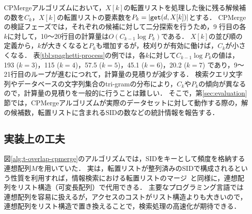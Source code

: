 \documentclass[japanese]{jnlp_JS2.0}
\begin{document}
CPMergeアルゴリズムにおいて，$X[k]$の転置リストを処理した後に残る解候補の数を$C_k$，$X[k]$の転置リストの要素数を$P_k = |\mbox{\tt get}(d, X[k])|$とする．
CPMergeの検証フェーズでは，それぞれの候補に対して二分探索を行うため，9 行目の各$k$に対して，10〜20行目の計算量は$O(C_{k-1} \log P_k)$である．
$X[k]$の並び順の定義から，$k$が大きくなると$P_k$も増加するが，枝刈りが有効に働けば，$C_k$が小さくなる．
表\ref{tbl:spaghetti-process}の例では，各$k$に対して$C_{k-1} \log P_k$の値は，193 ($k = 3$)，115 ($k = 4$)，57.5 ($k = 5$)，45.1 ($k = 6$)，20.2 ($k = 7$) であり，9〜21行目のループが進むにつれて，計算量の見積りが減少する．
検索クエリ文字列やデータベースの文字列集合のtri-gramの分布により，$C_k$や$P_k$の傾向が異なるので，計算量の見積りを一般的に行うことは難しい．
そこで，第\ref{sec:evaluation}節では，CPMergeアルゴリズムが実際のデータセットに対して動作する際の，解の候補数，転置リストに含まれるSIDの数などの統計情報を報告する．



\subsection{実装上の工夫}

図\ref{alg:t-overlap-cpmerge}のアルゴリズムでは，SIDをキーとして頻度を格納する連想配列$M$を用いていた．
実は，転置リストが整列済みのSIDで構成されるという性質を利用すれば，情報検索における転置リストのマージ~\cite{IR}と同様に，連想配列をリスト構造（可変長配列）で代用できる．
主要なプログラミング言語では連想配列を容易に扱えるが，アクセスのコストがリスト構造よりも大きいので，連想配列をリスト構造で置き換えることで，検索処理の高速化が期待できる．
\end{document}
